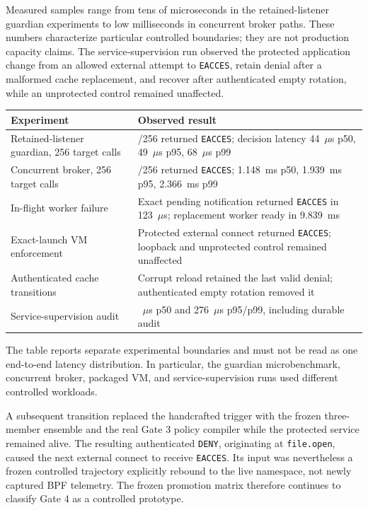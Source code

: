\documentclass[11pt,a4paper]{article}
\begin{document}
Measured samples range from tens of microseconds in the retained-listener
guardian experiments to low milliseconds in concurrent broker paths. These
numbers characterize particular controlled boundaries; they are not production
capacity claims. The service-supervision run observed the protected application
change from an allowed external attempt to \texttt{EACCES}, retain denial after
a malformed cache replacement, and recover after authenticated empty rotation,
while an unprotected control remained unaffected.

\begin{center}
\small
\begin{tabular}{>{\raggedright\arraybackslash}p{} >{\raggedright\arraybackslash}p{}}
\toprule
Experiment & Observed result \\
\midrule
Retained-listener guardian, 256 target calls~\cite{guardian} & 256/256 returned \texttt{EACCES}; decision latency 44~$\mu$s p50, 49~$\mu$s p95, 68~$\mu$s p99 \\
Concurrent broker, 256 target calls~\cite{concurrency} & 256/256 returned \texttt{EACCES}; 1.148~ms p50, 1.939~ms p95, 2.366~ms p99 \\
In-flight worker failure~\cite{inflight} & Exact pending notification returned \texttt{EACCES} in 123~$\mu$s; replacement worker ready in 9.839~ms \\
Exact-launch VM enforcement~\cite{exactlaunch} & Protected external connect returned \texttt{EACCES}; loopback and unprotected control remained unaffected \\
Authenticated cache transitions & Corrupt reload retained the last valid denial; authenticated empty rotation removed it \\
Service-supervision audit & 191~$\mu$s p50 and 276~$\mu$s p95/p99, including durable audit \\
\bottomrule
\end{tabular}
\end{center}

The table reports separate experimental boundaries and must not be read as one
end-to-end latency distribution. In particular, the guardian microbenchmark,
concurrent broker, packaged VM, and service-supervision runs used different
controlled workloads.

A subsequent transition replaced the handcrafted trigger with the frozen
three-member ensemble and the real Gate 3 policy compiler while the protected
service remained alive. The resulting authenticated \texttt{DENY}, originating
at \texttt{file.open}, caused the next external connect to receive
\texttt{EACCES}. Its input was nevertheless a frozen controlled trajectory
explicitly rebound to the live namespace, not newly captured BPF telemetry.
The frozen promotion matrix therefore continues to classify Gate 4 as a
controlled prototype.
\end{document}
